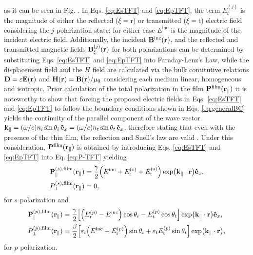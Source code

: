 %
as it can be seen in Fig. . In Eqs. \eqref{eq:EsTFT} and \eqref{eq:EpTFT}, the term $E_\xi^{(j)}$ is the magnitude of either the reflected ($\xi=\text{r}$) or transmitted ($\xi=\text{t}$) electric field considering the $j$ polarization state; for either case $E^\text{inc}$ is the magnitude of the incident electric field. Additionally, the incident $\vb{B}^\text{inc}(\vb{r})$, and the reflected and transmitted magnetic fields $\vb{B}_\xi^{(j)}(\vb{r})$ for both polarizations can be determined by substituting Eqs. \eqref{eq:EsTFT} and \eqref{eq:EpTFT} into Faraday-Lenz's Law, while the displacement field and the $H$ field are calculated via the bulk contitutive relations $\vb{D}=\varepsilon\vb{E}(\vb{r})$ and $\vb{H}(\vb{r})=\vb{B}(\vb{r})/\mu_0$ considering each medium linear, homogeneous and isotropic. Prior calculation of the total polarization in the film $\vb{P}^\text{film}(\vb{r}_\parallel)$ it is noteworthy to show that forcing the proposed electric fields in Eqs. \eqref{eq:EsTFT} and \eqref{eq:EpTFT} to follow the boundary conditions shown in Eqs. \eqref{eq:generalBC} yields the continuity of the parallel component of the wave vector $\vb{k}_\parallel = (\omega/c)n_i\sin\theta_i\, \vu{e}_x= (\omega/c)n_t\sin\theta_t\,\vu{e}_x$, therefore stating that even with the presence of the thin film, the reflection and Snell's law are valid \cite{lazzari_granfilm_2002,bedeaux_optical_2004}. Under this consideration, $\vb{P}^\text{film}(\vb{r}_\parallel)$ is obtained by introducing Eqs. \eqref{eq:EsTFT} and \eqref{eq:EpTFT} into Eq. \eqref{eq:P-TFT} yielding
%
\begin{subequations}%
\begin{align}
	\vb{P}^{(s),\text{film}}_\parallel(\vb{r}_\parallel) &=
				 \frac{\gamma}{2}\qty(E^\text{inc} + E_\text{r}^{(s)} + E_\text{t}^{(s)})\exp(\vb{k}_\parallel\cdot\vb{r}) \vu{e}_x,
	\\
	P_\perp^{(s),\text{film}}(\vb{r}_\parallel) &= 0,
\end{align}%
\label{eq:Pfilms}%
\end{subequations}%
%
for $s$ polarization and
%
\begin{subequations}%
\begin{align}
	\vb{P}^{(p),\text{film}}_\parallel(\vb{r}_\parallel) &= 
					\frac{\gamma}{2}\qty[
					\qty(E_\text{r}^{(p)}-E^\text{inc})\cos\theta_i
						-E_\text{t}^{(p)}\cos\theta_t
				] \exp(\vb{k}_\parallel\cdot\vb{r}) \vu{e}_x,
	\\
	P_\perp^{(p),\text{film}}(\vb{r}_\parallel)  &= \frac{\beta}{2}\qty[			
				\varepsilon_i\qty(E^\text{inc}+E_\text{r}^{(p)})\sin\theta_i 
				+ \varepsilon_t E_\text{t}^{(p)} \sin\theta_t ] \exp(\vb{k}_\parallel\cdot\vb{r}),
\end{align}%
\label{eq:Pfilmp}%
\end{subequations}%
%
for $p$ polarization.

